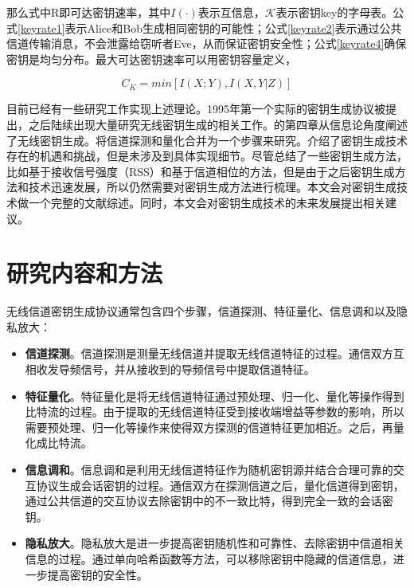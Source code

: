 \documentclass[master]{seuthesis} %
\begin{document}
\begin{Main}
那么式中R即可达密钥速率，其中$I(\cdot)$表示互信息，$\mathcal{K}$表示密钥key的字母表。公式\ref{keyrate1}表示Alice和Bob生成相同密钥的可能性；公式\ref{keyrate2}表示通过公共信道传输消息，不会泄露给窃听者Eve，从而保证密钥安全性；公式\ref{keyrate4}确保密钥是均匀分布。最大可达密钥速率可以用密钥容量定义，

\begin{equation}
    C_K = min[I(X;Y), I(X, Y|Z)]
\end{equation}

目前已经有一些研究工作实现上述理论。1995年第一个实际的密钥生成协议被提出\cite{hershey1995unconventional}，之后陆续出现大量研究无线密钥生成的相关工作。\citet{WangSurvey}的第四章从信息论角度阐述了无线密钥生成。\citet{WangSurvey}将信道探测和量化合并为一个步骤来研究。\citet{zeng2015physical}介绍了密钥生成技术存在的机遇和挑战，但是未涉及到具体实现细节。尽管\citet{ren2011secret}总结了一些密钥生成方法，比如基于接收信号强度（RSS）和基于信道相位的方法，但是由于之后密钥生成方法和技术迅速发展，所以仍然需要对密钥生成方法进行梳理。本文会对密钥生成技术做一个完整的文献综述。同时，本文会对密钥生成技术的未来发展提出相关建议。

\section{研究内容和方法}

无线信道密钥生成协议通常包含四个步骤，信道探测、特征量化、信息调和以及隐私放大：

\begin{itemize}
    \item \textbf{信道探测}。信道探测是测量无线信道并提取无线信道特征的过程。通信双方互相收发导频信号，并从接收到的导频信号中提取信道特征。
    \item \textbf{特征量化}。特征量化是将无线信道特征通过预处理、归一化、量化等操作得到比特流的过程。由于提取的无线信道特征受到接收端增益等参数的影响，所以需要预处理、归一化等操作来使得双方探测的信道特征更加相近。之后，再量化成比特流。
    \item \textbf{信息调和}。信息调和是利用无线信道特征作为随机密钥源并结合合理可靠的交互协议生成会话密钥的过程。通信双方在探测信道之后，量化信道得到密钥，通过公共信道的交互协议去除密钥中的不一致比特，得到完全一致的会话密钥。
    \item \textbf{隐私放大}。隐私放大是进一步提高密钥随机性和可靠性、去除密钥中信道相关信息的过程。通过单向哈希函数等方法，可以移除密钥中隐藏的信道信息，进一步提高密钥的安全性。
\end{itemize}


\end{Main}
\end{document}

